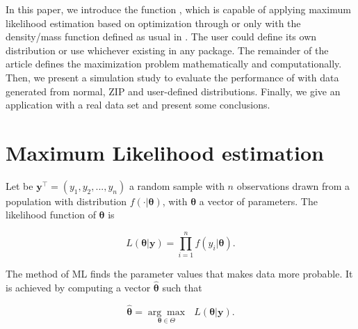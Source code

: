 \documentclass[nojss]{jss}
\begin{document}
In this paper, we introduce the function , which is capable of applying maximum likelihood estimation based on optimization through  or  only with the density/mass function defined as usual in . The user could define its own distribution or use whichever existing in any package. The remainder of the article defines the maximization problem mathematically and computationally. Then, we present a simulation study to evaluate the performance of  with data generated from normal, ZIP and user-defined distributions. Finally, we give an application with a real data set and present some conclusions.



\section{Maximum Likelihood estimation} \label{sec:MLE}

Let be $\boldsymbol{y}^\top=(y_1,y_2,...,y_n)$ a random sample with $n$ observations drawn from a population with distribution $f(\cdot|\boldsymbol{\theta})$, with $\boldsymbol{\theta}$ a vector of parameters. The likelihood function of $\boldsymbol{\theta}$ is

\begin{equation}
L(\boldsymbol{\theta}|\bm{y}) = \prod_{i=1}^{n}
f(y_i|\boldsymbol{\theta}).
\end{equation}

The method of ML finds the parameter values that makes data more probable. It is achieved by computing a vector $\boldsymbol{\hat{\theta}}$ such that

\begin{equation} \label{maxim}
\hat{\boldsymbol{\theta}} = \underset{\bm{\theta} \in \Theta}{\arg\max} \text{ } L(\boldsymbol{\theta}|\bm{y}).
\end{equation}
\end{document}
